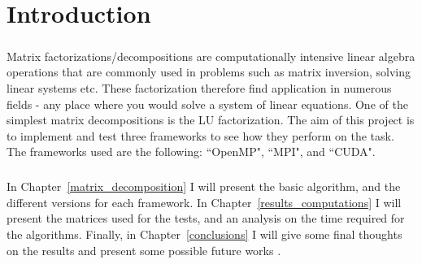 \chapter{Introduction}
\paragraph{}
Matrix factorizations/decompositions are computationally intensive linear algebra operations that are commonly used in problems such as matrix inversion, solving linear systems etc. These factorization therefore find application in numerous fields - any place where you would solve a system of linear equations. One of the simplest matrix decompositions is the LU factorization. The aim of this project is to implement and test three frameworks to see how they perform on the task. The frameworks used are the following: ``OpenMP", ``MPI", and ``CUDA".

\paragraph{}
In Chapter~\ref{matrix_decomposition} I will present the basic algorithm, and the different versions for each framework. In Chapter~\ref{results_computations} I will present the matrices used for the tests, and an analysis on the time required for the algorithms. Finally, in Chapter~\ref{conclusions} I will give some final thoughts on the results and present some possible future works .